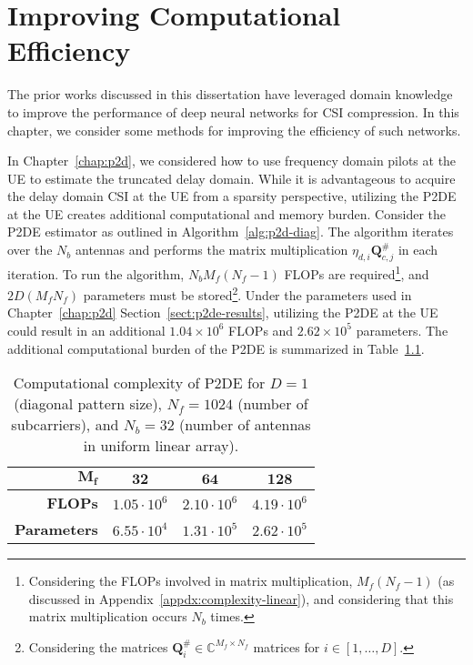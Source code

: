 \chapter{Improving Computational Efficiency} \label{chap:comp-effic}

The prior works discussed in this dissertation have leveraged domain knowledge to improve the performance of deep neural networks for CSI compression. In this chapter, we consider some methods for improving the efficiency of such networks.

In Chapter~\ref{chap:p2d}, we considered how to use frequency domain pilots at the UE to estimate the truncated delay domain. While it is advantageous to acquire the delay domain CSI at the UE from a sparsity perspective, utilizing the P2DE at the UE creates additional computational and memory burden. Consider the P2DE estimator as outlined in Algorithm~\ref{alg:p2d-diag}. The algorithm iterates over the $N_b$ antennas and performs the matrix multiplication $\eta_{d,i}\mathbf{Q}_{c,j}^{\#}$ in each iteration. To run the algorithm, $N_bM_f(N_f-1)$ FLOPs are required\footnote{Considering the FLOPs involved in matrix multiplication, $M_f(N_f-1)$ (as discussed in Appendix~\ref{appdx:complexity-linear}), and considering that this matrix multiplication occurs $N_b$ times.}, and $2D(M_fN_f)$ parameters must be stored\footnote{Considering the matrices $\mathbf{Q}_i^{\#} \in \mathbb{C}^{M_f \times N_f}$ matrices for $i \in [1, \dots, D]$.}. Under the parameters used in Chapter~\ref{chap:p2d} Section~\ref{sect:p2de-results}, utilizing the P2DE at the UE could result in an additional $1.04\times 10^{6}$ FLOPs and $2.62\times 10^{5}$ parameters. The additional computational burden of the P2DE is summarized in Table~\ref{tab:p2de-comp}. %

\begin{table}[!h]
\caption{Computational complexity of P2DE for $D=1$ (diagonal pattern size), $N_f=1024$ (number of subcarriers), and $N_b=32$ (number of antennas in uniform linear array).}
\begin{center}
\label{tab:p2de-comp} 
\begin{tabular}{|r|c|c|c|}
\hline
$\mathbf{M_f}$      & $\mathbf{32}$      & $\mathbf{64}$       & $\mathbf{128}$     \\ \hline
\textbf{FLOPs}      & $1.05\cdot 10^{6}$ & $2.10\cdot 10^{6}$  & $4.19\cdot 10^{6}$ \\ \hline
\textbf{Parameters} & $6.55\cdot 10^{4}$ & $1.31\cdot 10^{5}$  & $2.62\cdot 10^{5}$  \\ \hline
\end{tabular}
\end{center}
\vspace*{-0.3mm}
\end{table}

